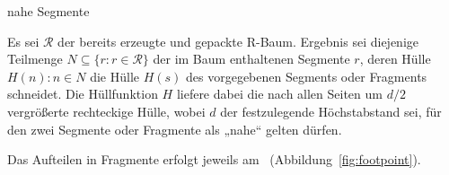 \documentclass[../main/thesis.tex]{subfiles}
\begin{document}

\begin{algorithm}[H]
\caption{nahe Segmente}\label{alg:NaheSegmente}
\begin{algorithmic}
	\State Es sei $\mathcal{R}$ der bereits erzeugte und gepackte R-Baum. Ergebnis sei diejenige Teilmenge $N \subseteq \{r : r \in \mathcal{R}\}$ der im Baum enthaltenen Segmente $r$, deren Hülle $H(n) : n \in N$ die Hülle $H(s)$ des vorgegebenen Segments oder Fragments schneidet. Die Hüllfunktion $H$ liefere dabei die nach allen Seiten um $d/2$ vergrößerte rechteckige Hülle, wobei $d$ der festzulegende Höchstabstand sei, für den zwei Segmente oder Fragmente als „nahe“ gelten dürfen.
\EndFunction
\end{algorithmic}
\end{algorithm}





Das Aufteilen in Fragmente erfolgt jeweils am ~(Abbildung~\ref{fig:footpoint}).
\end{document}
